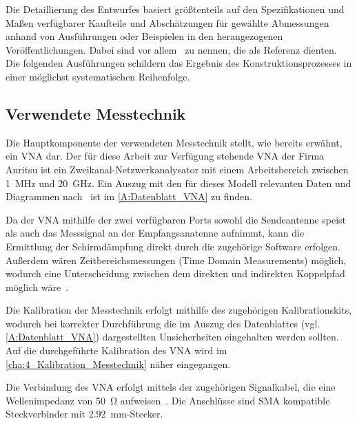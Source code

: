 
Die Detaillierung des Entwurfes basiert größtenteils auf den Spezifikationen und Maßen verfügbarer Kaufteile und Abschätzungen für gewählte Abmessungen anhand von Ausführungen oder Beispielen in den herangezogenen Veröffentlichungen. Dabei sind vor allem~\cite{Design_of_shielded_enclosures, EMV-gerechtes_Geraetedesign, EM_Schirmung, Simplified_shielding, Handbook_Shielding_Materials_and_Performance} zu nennen, die als Referenz dienten. Die folgenden Ausführungen schildern das Ergebnis des Konstruktionsprozesses in einer möglichst systematischen Reihenfolge.

\subsection{Verwendete Messtechnik}

Die Hauptkomponente der verwendeten Messtechnik stellt, wie bereits erwähnt, ein \ac{VNA} dar. Der für diese Arbeit zur Verfügung stehende \ac{VNA} der Firma Anritsu ist ein Zweikanal-Netzwerkanalysator mit einem Arbeitsbereich zwischen \SI{1}{\mega\hertz} und \SI{20}{\giga\hertz}. Ein Auszug mit den für dieses Modell relevanten Daten und Diagrammen nach~\cite{VNA-Datenblatt} ist im \Anhang\ref{A:Datenblatt_VNA} zu finden. 
\par
\vspace{\linespace}
Da der \ac{VNA} mithilfe der zwei verfügbaren Ports sowohl die Sendeantenne speist als auch das Messsignal an der Empfangsanatenne aufnimmt, kann die Ermittlung der Schirmdämpfung direkt durch die zugehörige Software erfolgen. Außerdem wären Zeitbereichsmessungen (Time Domain Measurements) möglich, wodurch eine Unterscheidung zwischen dem direkten und indirekten Koppelpfad möglich wäre~\cite{Techniques_Shielding_Effectiveness_Far_Field_Simulation}. %
\par
\vspace{\linespace}
Die Kalibration der Messtechnik erfolgt mithilfe des zugehörigen Kalibrationskits, wodurch bei korrekter Durchführung die im Auszug des Datenblattes (vgl. \Anhang\ref{A:Datenblatt_VNA}) dargestellten Unsicherheiten eingehalten werden sollten. Auf die durchgeführte Kalibration des \ac{VNA} wird im \Abschnitt\ref{cha:4_Kalibration_Messtechnik} näher eingegangen.
\par
\vspace{\linespace}
Die Verbindung des \ac{VNA} erfolgt mittels der zugehörigen Signalkabel, die eine Wellenimpedanz von \SI{50}{\ohm} aufweisen~\cite{Testkabel_VNA-Datenblatt}. Die Anschlüsse sind \ac{SMA} kompatible Steckverbinder mit \SI{2,92}{\milli\meter}-Stecker.
